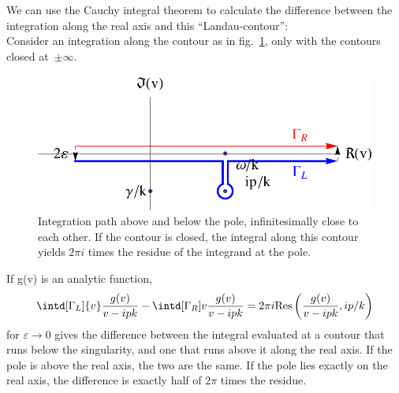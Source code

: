 \documentclass[physics,phd,nolot,nolof]{uccthesis}%
\begin{document}
We can use the Cauchy integral theorem to calculate the difference between the integration along the real axis and this ``Landau-contour'':\\
Consider an integration along the contour as in fig.~\ref{fig:residue}, only with the contours closed at~$\pm \infty$.
\begin{figure}[h]
	\begin{center}
	\includegraphics[width=.75\textwidth]{residue.pdf}
	\end{center}
	\caption{Integration path above and below the pole, infinitesimally close to each other. If the contour is closed, the integral along this contour yields $2\pi i $ times the residue of the integrand at the pole.}
	\label{fig:residue}
\end{figure}
If g(v) is an analytic function,
\begin{equation}
  \intd[\Gamma_L]{v} \frac{g(v)}{v-ipk}
 -\intd[\Gamma_R]v \frac{g(v)}{v-ipk}=2\pi i \text{Res}\left(\frac{g(v)}{v-ipk},ip/k\right)
	\label{eq:contourexplanation}
\end{equation}
for $\varepsilon\rightarrow0$ gives the difference between the integral evaluated at a contour that runs below the singularity, and one that runs above it along the real axis.
If the pole is above the real axis, the two are the same. If the pole lies exactly on the real axis, the difference is exactly half of $2\pi$ times the residue. 
\end{document}
